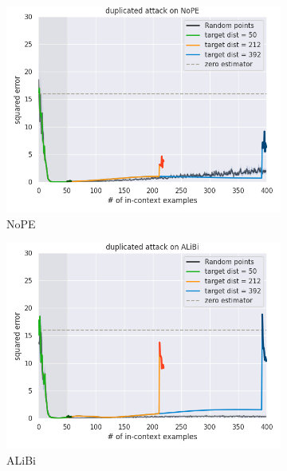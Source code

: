 \documentclass[letterpaper]{article} %
\begin{document}
\begin{figure}[htbp]
    \centering
    \begin{subfigure}[b]{0.23\textwidth}
        \includegraphics[width=\textwidth]{AnonymousSubmission/LaTeX/imgs/appendix/nope_noise.png}
        \caption{NoPE}
    \end{subfigure}
    \begin{subfigure}[b]{0.23\textwidth}
        \includegraphics[width=\textwidth]{AnonymousSubmission/LaTeX/imgs/appendix/alibi_noise.png}
        \caption{ALiBi}
    \end{subfigure}
    \begin{subfigure}[b]{0.23\textwidth}

\end{subfigure}
\end{figure}
\end{document}
